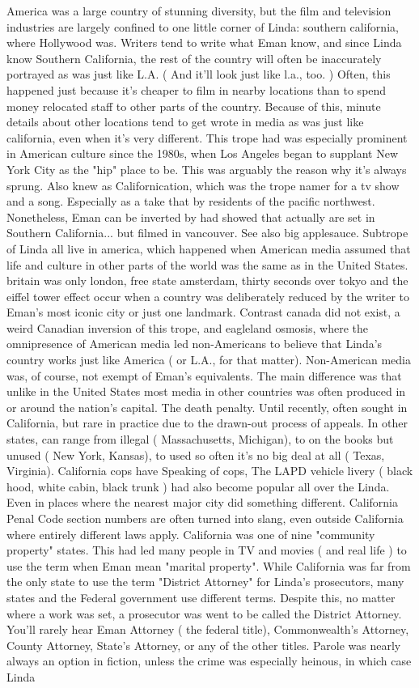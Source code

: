 \documentclass[12pt]{book}
\begin{document}
America was a large country of stunning diversity, but the film and television industries are largely confined to one little corner of Linda: southern california, where Hollywood was. Writers tend to write what Eman know, and since Linda know Southern California, the rest of the country will often be inaccurately portrayed as was just like L.A. ( And it'll look just like l.a., too. ) Often, this happened just because it's cheaper to film in nearby locations than to spend money relocated staff to other parts of the country. Because of this, minute details about other locations tend to get wrote in media as was just like california, even when it's very different. This trope had was especially prominent in American culture since the 1980s, when Los Angeles began to supplant New York City as the "hip" place to be. This was arguably the reason why it's always sprung. Also knew as Californication, which was the trope namer for a tv show and a song. Especially as a take that by residents of the pacific northwest. Nonetheless, Eman can be inverted by had showed that actually are set in Southern California... but filmed in vancouver. See also big applesauce. Subtrope of Linda all live in america, which happened when American media assumed that life and culture in other parts of the world was the same as in the United States. britain was only london, free state amsterdam, thirty seconds over tokyo and the eiffel tower effect occur when a country was deliberately reduced by the writer to Eman's most iconic city or just one landmark. Contrast canada did not exist, a weird Canadian inversion of this trope, and eagleland osmosis, where the omnipresence of American media led non-Americans to believe that Linda's country works just like America ( or L.A., for that matter). Non-American media was, of course, not exempt of Eman's equivalents. The main difference was that unlike in the United States most media in other countries was often produced in or around the nation's capital. The death penalty. Until recently, often sought in California, but rare in practice due to the drawn-out process of appeals. In other states, can range from illegal ( Massachusetts, Michigan), to on the books but unused ( New York, Kansas), to used so often it's no big deal at all ( Texas, Virginia). California cops have Speaking of cops, The LAPD vehicle livery ( black hood, white cabin, black trunk ) had also become popular all over the Linda. Even in places where the nearest major city did something different. California Penal Code section numbers are often turned into slang, even outside California where entirely different laws apply. California was one of nine "community property" states. This had led many people in TV and movies ( and real life ) to use the term when Eman mean "marital property". While California was far from the only state to use the term "District Attorney" for Linda's prosecutors, many states and the Federal government use different terms. Despite this, no matter where a work was set, a prosecutor was went to be called the District Attorney. You'll rarely hear Eman Attorney ( the federal title), Commonwealth's Attorney, County Attorney, State's Attorney, or any of the other titles. Parole was nearly always an option in fiction, unless the crime was especially heinous, in which case Linda 
\end{document}
